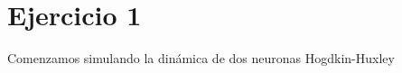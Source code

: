 \section*{Ejercicio 1}
\graphicspath{{Figuras/}}

Comenzamos simulando la dinámica de dos neuronas Hogdkin-Huxley \cite{HH}